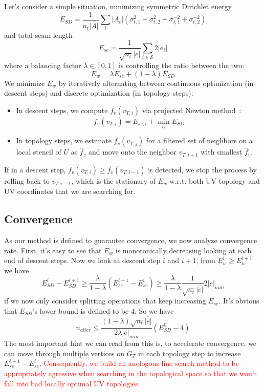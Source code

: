 Let's consider a simple situation, minimizing symmetric Dirichlet energy~\cite{Smith2015Bijective}
\[ E_{SD} = \frac{1}{n_t \overline{|A|}} \sum_t |A_t|(\sigma_{t,1}^2 + \sigma_{t,2}^2 + \sigma_{t,1}^{-2} + \sigma_{t,2}^{-2}) \]
and total seam length
\[ E_{se} = \frac{1}{\sqrt{n_t}\overline{|e|}} \sum_{i \in \mathcal{S}} 2|e_i| \]
where a balancing factor $\lambda \in [0, 1]$ is controlling the ratio between the two: 
\[ E_w = \lambda E_{se} + (1 - \lambda) E_{SD} \]
We minimize $E_w$ by iteratively alternating between continuous optimization (in descent steps) and discrete optimization (in topology steps):
\begin{itemize}
\item In descent steps, we compute $f_v(v_{T,i})$ via projected Newton method~\cite{Teran2005Robust}:
\[ f_v(v_{T,i}) = E_{se,i} + \min_U E_{SD} \]
\item In topology steps, we estimate $f_v(v_{T,j})$ for a filtered set of neighbors on a local stencil of $U$ as $\hat{f}_v$ and move onto the neighbor $v_{T,i+1}$ with smallest $\hat{f}_v$.
\end{itemize}
If in a descent step, $f_v(v_{T,i}) \geq f_v(v_{T,i-1})$ is detected, we stop the process by rolling back to $v_{T,i-1}$, which is the stationary of $E_w$ w.r.t. both UV topology and UV coordinates that we are searching for.

\subsection{Convergence}

As our method is defined to guarantee convergence, we now analyze convergence rate. First, it's easy to see that $E_w$ is monotonically decreasing looking at each end of descent steps. Now we look at descent step $i$ and $i+1$, from $E^i_w \geq E^{i+1}_w$ we have
\[ E^i_{SD} - E^{i+1}_{SD} \geq \frac{\lambda}{1-\lambda} (E^{i+1}_{se} - E^i_{se}) \geq \frac{\lambda}{1-\lambda} \frac{1}{\sqrt{n_t}\overline{|e|}} 2|e|_{min} \]
if we now only consider splitting operations that keep increasing $E_{se}$. It's obvious that $E_{SD}$'s lower bound is defined to be $4$. So we have
\[ n_{alter} \leq \frac{(1-\lambda)\sqrt{n_t}\overline{|e|}}{2\lambda|e|_{min}} (E^0_{SD} - 4) \]
The most important hint we can read from this is, to accelerate convergence, we can move through multiple vertices on $G_T$ in each topology step to increase $E^{i+1}_{se} - E^i_{se}$. \textcolor{red}{Consequently, we build an anologous line search method to be appropriately agressive when searching in the topological space so that we won't fall into bad locally optimal UV topologies.}

